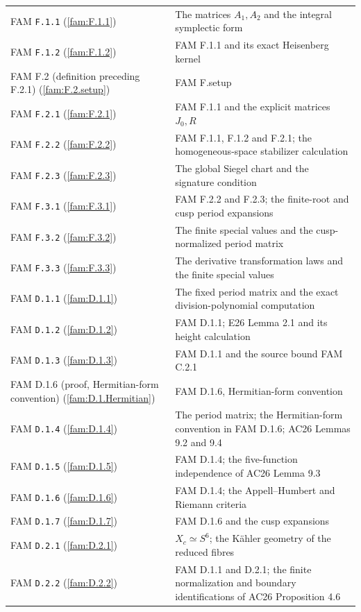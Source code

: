 \documentclass[11pt,a4paper]{article}
\theoremstyle{plain}
\theoremstyle{definition}
\begin{document}
\begin{longtable}{@{}L{.21\linewidth}L{.73\linewidth}@{}}
FAM \nolinkurl{F.1.1} (\ref{fam:F.1.1}) & The matrices $A_1,A_2$ and the integral symplectic form\\
FAM \nolinkurl{F.1.2} (\ref{fam:F.1.2}) & FAM F.1.1 and its exact Heisenberg kernel\\
FAM F.2 (definition preceding F.2.1) (\ref{fam:F.2.setup}) & FAM F.setup\\
FAM \nolinkurl{F.2.1} (\ref{fam:F.2.1}) & FAM F.1.1 and the explicit matrices $J_0,R$\\
FAM \nolinkurl{F.2.2} (\ref{fam:F.2.2}) & FAM F.1.1, F.1.2 and F.2.1; the homogeneous-space stabilizer calculation\\
FAM \nolinkurl{F.2.3} (\ref{fam:F.2.3}) & The global Siegel chart and the signature condition\\
FAM \nolinkurl{F.3.1} (\ref{fam:F.3.1}) & FAM F.2.2 and F.2.3; the finite-root and cusp period expansions\\
FAM \nolinkurl{F.3.2} (\ref{fam:F.3.2}) & The finite special values and the cusp-normalized period matrix\\
FAM \nolinkurl{F.3.3} (\ref{fam:F.3.3}) & The derivative transformation laws and the finite special values\\
FAM \nolinkurl{D.1.1} (\ref{fam:D.1.1}) & The fixed period matrix and the exact division-polynomial computation\\
FAM \nolinkurl{D.1.2} (\ref{fam:D.1.2}) & FAM D.1.1; E26 Lemma 2.1 and its height calculation\\
FAM \nolinkurl{D.1.3} (\ref{fam:D.1.3}) & FAM D.1.1 and the source bound FAM C.2.1\\
FAM D.1.6 (proof, Hermitian-form convention) (\ref{fam:D.1.Hermitian}) & FAM D.1.6, Hermitian-form convention\\
FAM \nolinkurl{D.1.4} (\ref{fam:D.1.4}) & The period matrix; the Hermitian-form convention in FAM D.1.6; AC26 Lemmas 9.2 and 9.4\\
FAM \nolinkurl{D.1.5} (\ref{fam:D.1.5}) & FAM D.1.4; the five-function independence of AC26 Lemma 9.3\\
FAM \nolinkurl{D.1.6} (\ref{fam:D.1.6}) & FAM D.1.4; the Appell--Humbert and Riemann criteria\\
FAM \nolinkurl{D.1.7} (\ref{fam:D.1.7}) & FAM D.1.6 and the cusp expansions\\
FAM \nolinkurl{D.2.1} (\ref{fam:D.2.1}) & $X_c\simeq S^6$; the K\"ahler geometry of the reduced fibres\\
FAM \nolinkurl{D.2.2} (\ref{fam:D.2.2}) & FAM D.1.1 and D.2.1; the finite normalization and boundary identifications of AC26 Proposition 4.6\\

\end{longtable}
\end{document}

